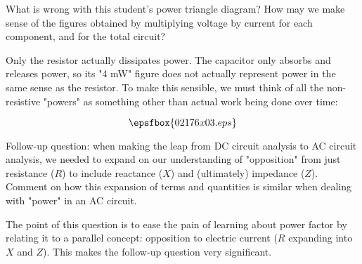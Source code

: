 What is wrong with this student's power triangle diagram?  How may we make sense of the figures obtained by multiplying voltage by current for each component, and for the total circuit?







Only the resistor actually dissipates power.  The capacitor only absorbs and releases power, so its "4 mW" figure does not actually represent power in the same sense as the resistor.  To make this sensible, we must think of all the non-resistive "powers" as something other than actual work being done over time:

$$\epsfbox{02176x03.eps}$$

Follow-up question: when making the leap from DC circuit analysis to AC circuit analysis, we needed to expand on our understanding of "opposition" from just resistance ($R$) to include reactance ($X$) and (ultimately) impedance ($Z$).  Comment on how this expansion of terms and quantities is similar when dealing with "power" in an AC circuit.







The point of this question is to ease the pain of learning about power factor by relating it to a parallel concept: opposition to electric current ($R$ expanding into $X$ and $Z$).  This makes the follow-up question very significant.




